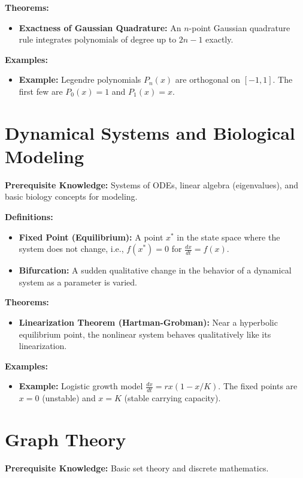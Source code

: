 \textbf{Theorems:}
\begin{itemize}
    \item \textbf{Exactness of Gaussian Quadrature:} An $n$-point Gaussian quadrature rule integrates polynomials of degree up to $2n - 1$ exactly.
\end{itemize}

\textbf{Examples:}
\begin{itemize}
    \item \textbf{Example:} Legendre polynomials $P_n(x)$ are orthogonal on $[-1,1]$. The first few are $P_0(x) = 1$ and $P_1(x) = x$.
\end{itemize}


\section{Dynamical Systems and Biological Modeling}
\textbf{Prerequisite Knowledge:} Systems of ODEs, linear algebra (eigenvalues), and basic biology concepts for modeling.

\textbf{Definitions:}
\begin{itemize}
    \item \textbf{Fixed Point (Equilibrium):} A point $x^*$ in the state space where the system does not change, i.e., $f(x^*) = 0$ for $\frac{dx}{dt} = f(x)$.
    \item \textbf{Bifurcation:} A sudden qualitative change in the behavior of a dynamical system as a parameter is varied.
\end{itemize}

\textbf{Theorems:}
\begin{itemize}
    \item \textbf{Linearization Theorem (Hartman-Grobman):} Near a hyperbolic equilibrium point, the nonlinear system behaves qualitatively like its linearization.
\end{itemize}

\textbf{Examples:}
\begin{itemize}
    \item \textbf{Example:} Logistic growth model $\frac{dx}{dt} = r x(1 - x/K)$. The fixed points are $x=0$ (unstable) and $x=K$ (stable carrying capacity).
\end{itemize}


\section{Graph Theory}
\textbf{Prerequisite Knowledge:} Basic set theory and discrete mathematics.

